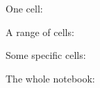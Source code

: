\documentclass{article}
\begin{document}
One cell:



A range of cells:



Some specific cells:



The whole notebook:

\end{document}

